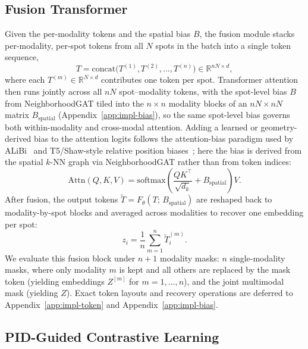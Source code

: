 \documentclass{article}
\theoremstyle{plain}
\theoremstyle{definition}
\begin{document}
\subsection{Fusion Transformer}
\label{subsec:fusion-transformer}

Given the per-modality tokens and the spatial bias $B$, the fusion module stacks per-modality, per-spot tokens from all $N$ spots in the batch into a single token sequence,
\begin{equation}
  T = \mathrm{concat}\bigl(T^{(1)}, T^{(2)}, \ldots, T^{(n)}\bigr) \in \mathbb{R}^{nN \times d},
\end{equation}
where each $T^{(m)} \in \mathbb{R}^{N \times d}$ contributes one token per spot. Transformer attention~\cite{vaswani2017attention} then runs jointly across all $nN$ spot--modality tokens, with the spot-level bias $B$ from NeighborhoodGAT tiled into the $n \times n$ modality blocks of an $nN \times nN$ matrix $B_{\mathrm{spatial}}$ (Appendix~\ref{app:impl-bias}), so the same spot-level bias governs both within-modality and cross-modal attention. Adding a learned or geometry-derived bias to the attention logits follows the attention-bias paradigm used by ALiBi~\cite{press2022train} and T5/Shaw-style relative position biases~\cite{raffel2020exploring,shaw2018self}; here the bias is derived from the spatial $k$-NN graph via NeighborhoodGAT rather than from token indices:
\begin{equation}
  \mathrm{Attn}(Q,K,V)
  = \mathrm{softmax}\!\left(
    \frac{QK^\top}{\sqrt{d_k}} + B_{\mathrm{spatial}}
  \right)V.
\end{equation}
After fusion, the output tokens $\tilde T = F_\theta(T;\,B_{\mathrm{spatial}})$ are reshaped back to modality-by-spot blocks and averaged across modalities to recover one embedding per spot:
\begin{equation}
  z_i = \frac{1}{n}\sum_{m=1}^{n} \tilde T^{(m)}_i.
\end{equation}
We evaluate this fusion block under $n + 1$ modality masks: $n$ single-modality masks, where only modality $m$ is kept and all others are replaced by the mask token (yielding embeddings $Z^{[m]}$ for $m = 1, \ldots, n$), and the joint multimodal mask (yielding $Z$). Exact token layouts and recovery operations are deferred to Appendix~\ref{app:impl-token} and Appendix~\ref{app:impl-bias}.

\subsection{PID-Guided Contrastive Learning}
\label{subsec:pid-contrastive}
\end{document}
